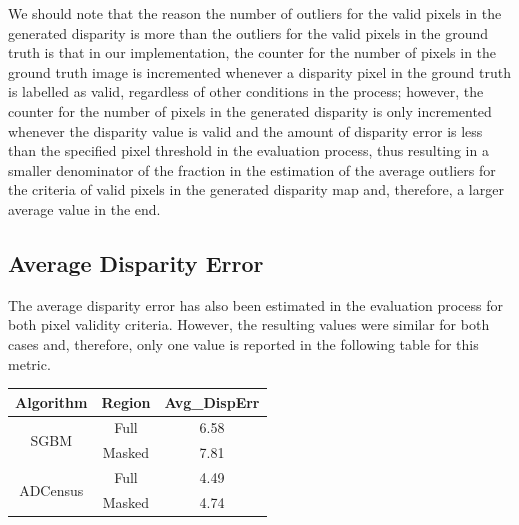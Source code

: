 We should note that the reason the number of outliers for the valid pixels in the generated disparity is more than the outliers for the valid pixels
in the ground truth is that in our implementation, the counter for the number of pixels in the ground truth image 
is incremented whenever a disparity pixel in the ground truth is labelled as valid, regardless of other conditions in the process; 
however, the counter for the number of pixels in the generated disparity
is only incremented whenever the disparity value is valid and the amount of disparity error is less than the specified pixel threshold in the evaluation process, thus resulting
in a smaller denominator of the fraction in the estimation of the average outliers for the criteria of valid pixels in the generated disparity map and, therefore, a larger 
average value in the end.

\subsection{Average Disparity Error}
The average disparity error has also been estimated in the evaluation process for both pixel validity criteria. However, the resulting values
were similar for both cases and, therefore, only one value is reported in the following table for this metric. \newline

\begin{minipage}{\linewidth}
\begin{center}
\label{tab:avgerr}
\begin{tabular}{ |c|c|c| }
\hline
Algorithm & Region & Avg\_DispErr \\ \hline
\multirow{2}{*}{SGBM} & Full & 6.58 \\ \cline{2-3}
& Masked & 7.81 \\ \hline
\multirow{2}{*}{ADCensus} & Full & 4.49 \\ \cline{2-3}
& Masked & 4.74 \\ \hline
\end{tabular}
\end{center}
\end{minipage} \newline

